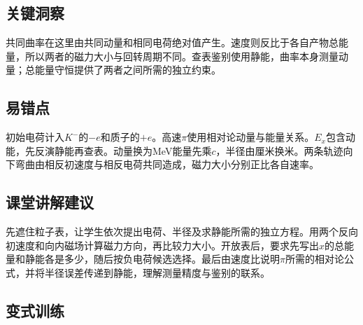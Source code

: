 \documentclass[UTF8,fontset=fandol,a4paper,11pt]{ctexart}
\begin{document}


\subsection*{关键洞察}

共同曲率在这里由共同动量和相同电荷绝对值产生。速度则反比于各自产物总能量，所以两者的磁力大小与回转周期不同。查表鉴别使用静能，曲率本身测量动量；总能量守恒提供了两者之间所需的独立约束。



\subsection*{易错点}

初始电荷计入$K^-$的$-e$和质子的$+e$。高速$\pi$使用相对论动量与能量关系。$E_x$包含动能，先反演静能再查表。动量换为MeV能量先乘$c$，半径由厘米换米。两条轨迹向下弯曲由相反初速度与相反电荷共同造成，磁力大小分别正比各自速率。



\subsection*{课堂讲解建议}

先遮住粒子表，让学生依次提出电荷、半径及求静能所需的独立方程。用两个反向初速度和向内磁场计算磁力方向，再比较力大小。开放表后，要求先写出$x$的总能量和静能各是多少，随后按负电荷候选选择。最后由速度比说明$\pi$所需的相对论公式，并将半径误差传递到静能，理解测量精度与鉴别的联系。



\subsection*{变式训练}
\end{document}
